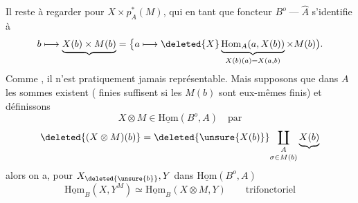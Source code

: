 Il reste à regarder pour $X\times p_A^*(M)$, qui en tant que foncteur $B^o\mathbin{\text{---}}\widehat A$ s'identifie à
\[
b\longmapsto\underbrace{X(b)\times M(b)}=\bigl\{a\longmapsto\deleted{X}\underbrace{\mathrm{Hom}_A(a,X(b))}_{X(b)(a)=X(a,b)}\times M(b)\bigr).
\]
Comme , il n'est pratiquement jamais représentable. Mais supposons que dans $A$ les sommes existent ( finies suffisent si les $M(b)$ sont eux-mêmes finis) et définissons
\[
X\otimes M\in\underline{\mathrm{Hom}}(B^o,A)\quad\text{par}
\]
\[
\deleted{(X\otimes M)(b)}=\deleted{\unsure{X(b)}}\underset{\sigma\in M(b)}{\coprod_A}\underbrace{X(b)}
\]
alors on a, pour $X_{\deleted{\unsure{b}}},Y$ dans $\underline{\mathrm{Hom}}(B^o,A)$
\[
\underline{\mathrm{Hom}}_B(X,Y^M)\simeq\underline{\mathrm{Hom}}_B(X\otimes M,Y)\qquad\text{trifonctoriel}
\]

